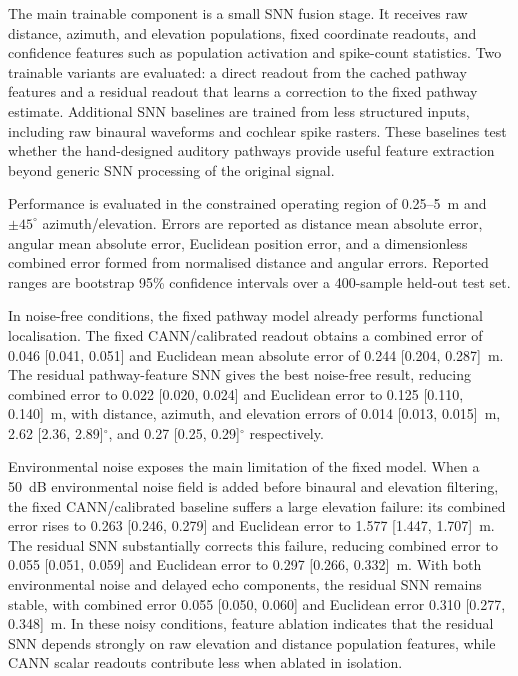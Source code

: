 The main trainable component is a small SNN fusion stage. It receives raw distance, azimuth, and elevation populations, fixed coordinate readouts, and confidence features such as population activation and spike-count statistics. Two trainable variants are evaluated: a direct readout from the cached pathway features and a residual readout that learns a correction to the fixed pathway estimate. Additional SNN baselines are trained from less structured inputs, including raw binaural waveforms and cochlear spike rasters. These baselines test whether the hand-designed auditory pathways provide useful feature extraction beyond generic SNN processing of the original signal.

Performance is evaluated in the constrained operating region of 0.25--5~m and $\pm45^\circ$ azimuth/elevation. Errors are reported as distance mean absolute error, angular mean absolute error, Euclidean position error, and a dimensionless combined error formed from normalised distance and angular errors. Reported ranges are bootstrap 95\% confidence intervals over a 400-sample held-out test set.

In noise-free conditions, the fixed pathway model already performs functional localisation. The fixed CANN/calibrated readout obtains a combined error of 0.046 [0.041, 0.051] and Euclidean mean absolute error of 0.244 [0.204, 0.287]~m. The residual pathway-feature SNN gives the best noise-free result, reducing combined error to 0.022 [0.020, 0.024] and Euclidean error to 0.125 [0.110, 0.140]~m, with distance, azimuth, and elevation errors of 0.014 [0.013, 0.015]~m, 2.62 [2.36, 2.89]$^\circ$, and 0.27 [0.25, 0.29]$^\circ$ respectively.

Environmental noise exposes the main limitation of the fixed model. When a 50~dB environmental noise field is added before binaural and elevation filtering, the fixed CANN/calibrated baseline suffers a large elevation failure: its combined error rises to 0.263 [0.246, 0.279] and Euclidean error to 1.577 [1.447, 1.707]~m. The residual SNN substantially corrects this failure, reducing combined error to 0.055 [0.051, 0.059] and Euclidean error to 0.297 [0.266, 0.332]~m. With both environmental noise and delayed echo components, the residual SNN remains stable, with combined error 0.055 [0.050, 0.060] and Euclidean error 0.310 [0.277, 0.348]~m. In these noisy conditions, feature ablation indicates that the residual SNN depends strongly on raw elevation and distance population features, while CANN scalar readouts contribute less when ablated in isolation.

